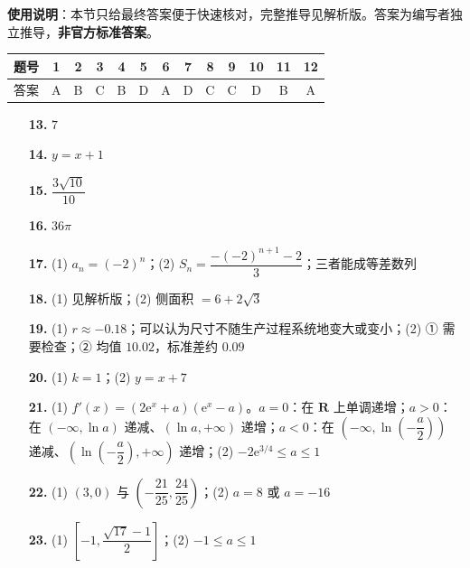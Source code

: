 
\begin{gknotice}
\textbf{使用说明}：本节只给最终答案便于快速核对，完整推导见解析版。答案为编写者独立推导，\textbf{非官方标准答案}。
\end{gknotice}

\begin{center}\begin{tabular}{ccccccccccccc}
\toprule
题号 & 1 & 2 & 3 & 4 & 5 & 6 & 7 & 8 & 9 & 10 & 11 & 12 \\
\midrule
答案 & A & B & C & B & D & A & D & C & C & D & B & A \\
\bottomrule
\end{tabular}\end{center}

\begin{itemize}[leftmargin=2.6em]
  \item[\textbf{13.}] $7$
  \item[\textbf{14.}] $y=x+1$
  \item[\textbf{15.}] $\dfrac{3\sqrt{10}}{10}$
  \item[\textbf{16.}] $36\pi$
\end{itemize}

\begin{itemize}[leftmargin=2.6em]
  \item[\textbf{17.}] (1) $a_n=(-2)^{n}$；(2) $S_n=\dfrac{-(-2)^{n+1}-2}3$；三者能成等差数列
  \item[\textbf{18.}] (1) 见解析版；(2) 侧面积 $=6+2\sqrt3$
  \item[\textbf{19.}] (1) $r\approx-0.18$；可以认为尺寸不随生产过程系统地变大或变小；(2) ① 需要检查；② 均值 $10.02$，标准差约 $0.09$
  \item[\textbf{20.}] (1) $k=1$；(2) $y=x+7$
  \item[\textbf{21.}] (1) $f'(x)=\left(2\mathrm e^{x}+a\right)\left(\mathrm e^{x}-a\right)$。$a=0$：在 $\mathbf R$ 上单调递增；$a>0$：在 $(-\infty,\ln a)$ 递减、$(\ln a,+\infty)$ 递增；$a<0$：在 $\left(-\infty,\ln\left(-\dfrac a2\right)\right)$ 递减、$\left(\ln\left(-\dfrac a2\right),+\infty\right)$ 递增；(2) $-2\mathrm e^{3/4}\le a\le1$
\end{itemize}

\begin{itemize}[leftmargin=2.6em]
  \item[\textbf{22.}] (1) $(3,0)$ 与 $\left(-\dfrac{21}{25},\dfrac{24}{25}\right)$；(2) $a=8$ 或 $a=-16$
  \item[\textbf{23.}] (1) $\left[-1,\dfrac{\sqrt{17}-1}2\right]$；(2) $-1\le a\le1$
\end{itemize}
